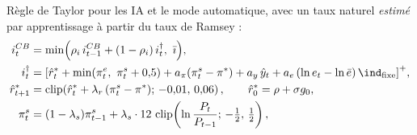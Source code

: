 \documentclass[11pt,a4paper]{article}
\newcommand{\pos}[1]{{\left[#1\right]^{+}}}
\newcommand{\clip}[3]{\operatorname{clip}\!\left(#1;\,#2,\,#3\right)}
\begin{document}
Règle de Taylor pour les IA et le mode automatique, avec un taux naturel \emph{estimé} par apprentissage à partir du taux de Ramsey :
\begin{equation}
\begin{split}
i^{CB}_t &= \min\!\Big(\rho_i\, i^{CB}_{t-1} + (1-\rho_i)\,i^{\dagger}_t,\ \bar\imath\Big),\\
i^{\dagger}_t &= \pos{ \hat r^\ast_t + \min(\pi^e_t,\ \pi^s_t+0{,}5) + a_\pi(\pi^s_t - \pi^\ast) + a_y\, \hat y_t + a_e\,(\ln e_t - \ln \bar e)\,\ind_{\text{fixe}} },\\
\hat r^\ast_{t+1} &= \clip{\hat r^\ast_t + \lambda_{r}\,(\pi^s_t - \pi^\ast)}{-0{,}01}{0{,}06}, \qquad \hat r^\ast_0 = \rho+\sigma g_0, \qquad\\
\pi^s_t &= (1-\lambda_s)\pi^s_{t-1} + \lambda_s\cdot 12\,\clip{\ln\frac{P_t}{P_{t-1}}}{-\tfrac12}{\tfrac12},
\end{split}
\label{eq:taylor}
\end{equation}
\end{document}
